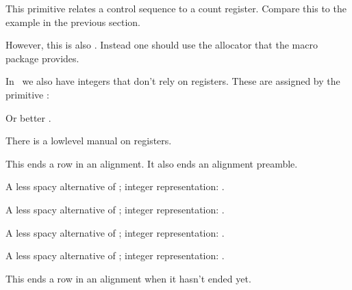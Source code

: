 This primitive relates a control sequence to a count register. Compare this to
the example in the previous section.

\starttyping
\countdef{}
\stoptyping

However, this is also . Instead one should use the allocator that
the macro package provides.

\starttyping
\newcount\MyCounter
{}
\stoptyping

In \LUAMETATEX\ we also have integers that don't rely on registers. These are
assigned by the primitive :

\starttyping
\integerdef{}
\stoptyping

Or better \type {\newinteger}.

\starttyping
\newinteger\MyCounterB
{}
\stoptyping

There is a lowlevel manual on registers.

\stopoldprimitive

\startoldprimitive[title={\prm {cr}}]

This ends a row in an alignment. It also ends an alignment preamble.
\stopoldprimitive

\startnewprimitive[title={\prm {crampeddisplaystyle}}]

A less spacy alternative of ; integer representation:
\the\scriptstyle.

\stopnewprimitive

\startnewprimitive[title={\prm {crampedscriptscriptstyle}}]

A less spacy alternative of ; integer representation:
\the\scriptscriptstyle.

\stopnewprimitive

\startnewprimitive[title={\prm {crampedscriptstyle}}]

A less spacy alternative of ; integer representation:
\the\scriptstyle.

\stopnewprimitive

\startnewprimitive[title={\prm {crampedtextstyle}}]

A less spacy alternative of ; integer representation:
\the\textstyle.

\stopnewprimitive

\startoldprimitive[title={\prm {crcr}}]

This ends a row in an alignment when it hasn't ended yet.

